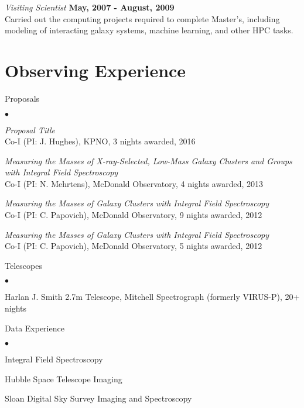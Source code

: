 \documentclass[margin,line, 11pt]{res}
\newenvironment{list2}{
  \begin{list}{$\bullet$}{%
      \setlength{\itemsep}{0in}
      \setlength{\parsep}{0in} \setlength{\parskip}{0in}
      \setlength{\topsep}{0in} \setlength{\partopsep}{0in} 
      \setlength{\leftmargin}{0.2in}}}{\end{list}}
\begin{document}
\begin{resume}
{\em Visiting Scientist} \hfill \textbf{May, 2007 - August, 2009}\\
Carried out the computing projects required to complete Master's, including
modeling of interacting galaxy systems, machine learning, and other HPC tasks. 
\vspace*{-3mm}

\section{\sc Observing Experience}
Proposals
    \begin{list2}
        \vspace*{.05in}
    \item \emph{Proposal Title}\\
    Co-I (PI: J. Hughes), KPNO, 3 nights awarded, 2016
    \item \emph{Measuring the Masses of X-ray-Selected, Low-Mass Galaxy Clusters and Groups with Integral Field Spectroscopy}\\
		Co-I (PI: N. Mehrtens), McDonald Observatory, 4 nights awarded, 2013
    \item \emph{Measuring the Masses of Galaxy Clusters with Integral Field Spectroscopy}\\
		Co-I (PI: C. Papovich), McDonald Observatory, 9 nights awarded, 2012
    \item \emph{Measuring the Masses of Galaxy Clusters with Integral Field Spectroscopy}\\
		Co-I (PI: C. Papovich), McDonald Observatory, 5 nights awarded, 2012
	\end{list2}
Telescopes
    \begin{list2}
        \vspace*{.05in}
    \item Harlan J. Smith 2.7m Telescope, Mitchell Spectrograph (formerly VIRUS-P), 20+ nights
	\end{list2}
Data Experience
    \begin{list2}
        \vspace*{.05in}
		\item Integral Field Spectroscopy
    	\item Hubble Space Telescope Imaging
		\item Sloan Digital Sky Survey Imaging and Spectroscopy
	\end{list2}


\end{resume}
\end{document}
